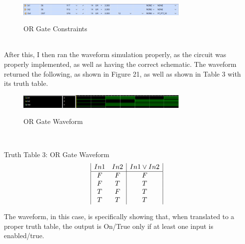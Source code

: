 \documentclass{article}
\begin{document}
\begin{figure}[!htbp]
    \centering
    \caption{OR Gate Constraints}
    \includegraphics[width=0.75\textwidth]{OR-GATE-CONSTRAINTS.png}
    \label{OR Gate, Constrants}
\end{figure}\\
After this, I then ran the waveform simulation properly, as the circuit was properly implemented, as well as having the correct schematic. The waveform returned the following, as shown in Figure 21, as well as shown in Table 3 with its truth table.\\
\begin{figure}[!htbp]
    \centering
    \caption{OR Gate Waveform}
    \includegraphics[width=0.75\textwidth]{OR-GATE-WAVEFORM.png}
    \label{OR Gate, Waveform}
\end{figure}\\
\begin{center}
    Truth Table 3: OR Gate Waveform
    \begin{displaymath}
    \begin{array}{|c c|c|}
    In1 & In2 & In1 \lor In2\\
    \hline
    F & F & F\\
    F & T & T\\
    T & F & T\\
    T & T & T\\
    \end{array}
    \end{displaymath}
\end{center}
The waveform, in this case, is specifically showing that, when translated to a proper truth table, the output is On/True only if at least one input is enabled/true.
\newpage
\end{document}
